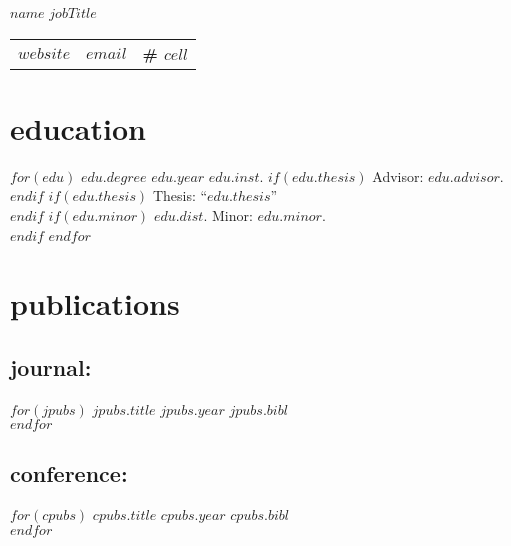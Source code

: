 \documentclass[]{friggeri-cv}
\begin{document}
\header
  {$name$}
  {$jobTitle$}



\vspace{-0.4in}
\hspace{0.35in}
\begin{tabular}{p{7.25cm}p{6cm}p{6cm}}
  \textbf{\href{$website$}{$website$}} &
  \textbf{\href{mailto:$email$}{$email$}} &
  \textbf{\# $cell$}
\end{tabular}



\vspace{-0.05in}

\section{education}
\begin{entrylist}
$for(edu)$
  \entrypub
  {$edu.degree$}
  {$edu.year$}
  {$edu.inst$.}
  $if(edu.thesis)$
    {Advisor: $edu.advisor$}.\\
  $endif$
  $if(edu.thesis)$
    {Thesis: ``$edu.thesis$''}\\
  $endif$
  $if(edu.minor)$
    {$edu.dist$. Minor: $edu.minor$}.\\
  $endif$
$endfor$
\end{entrylist}



\vspace{-0.15in}

\section{publications}

\vspace{-0.05in}
\subsection{journal:}
\begin{entrylist}
$for(jpubs)$
  \entrypub
  {$jpubs.title$}
  {$jpubs.year$}
  {$jpubs.bibl$}\\
$endfor$
\end{entrylist}

\vspace{-0.15in}
\subsection{conference:}
\begin{entrylist}
$for(cpubs)$
  \entrypub
  {$cpubs.title$}
  {$cpubs.year$}
  {$cpubs.bibl$}\\
$endfor$
\end{entrylist}
\end{document}
